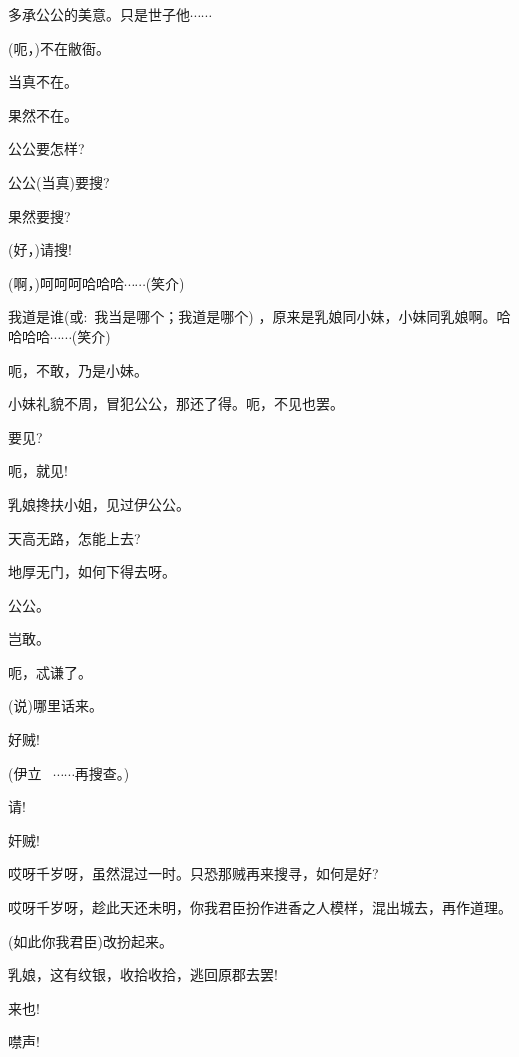 {多承公公的美意。只是世子他$\cdots{}\cdots{}$

(呃，)不在敝衙。

当真不在。

果然不在。

公公要怎样?

公公(当真)要搜?

果然要搜?

(好，)请搜!

(啊，)呵呵呵哈哈哈$\cdots{}\cdots{}$({\hwfs 笑介})

我道是谁({\akai 或}:~我当是哪个；我道是哪个) ，原来是乳娘同小妹，小妹同乳娘啊。哈哈哈哈$\cdots{}\cdots{}$({\hwfs 笑}{\hwfs 介})

呃，不敢，乃是小妹。

小妹礼貌不周，冒犯公公，那还了得。呃，不见也罢。

要见?

呃，就见!

乳娘搀扶小姐，见过伊公公。

天高无路，怎能上去?

地厚无门，如何下得去呀。

公公。

岂敢。

呃，忒谦了。

(说)哪里话来。

好贼!

(伊立\hspace{30pt}~ $\cdots{}\cdots{}$再搜查。)

请!

奸贼!




哎呀千岁呀，虽然混过一时。只恐那贼再来搜寻，如何是好?

哎呀千岁呀，趁此天还未明，你我君臣扮作进香之人模样，混出城去，再作道理。

(如此你我君臣)改扮起来。

乳娘，这有纹银，收拾收拾，逃回原郡去罢!

来也!

噤声!

{\vspace{5pt}}

}
